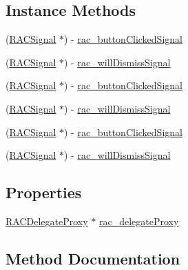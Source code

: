 \subsection*{Instance Methods}
\begin{DoxyCompactItemize}
\item 
(\mbox{\hyperlink{interface_r_a_c_signal}{R\+A\+C\+Signal}} $\ast$) -\/ \mbox{\hyperlink{category_u_i_alert_view_07_r_a_c_signal_support_08_afc61c8b02f0adc4622f827eef4a8c2af}{rac\+\_\+button\+Clicked\+Signal}}
\item 
(\mbox{\hyperlink{interface_r_a_c_signal}{R\+A\+C\+Signal}} $\ast$) -\/ \mbox{\hyperlink{category_u_i_alert_view_07_r_a_c_signal_support_08_aa0ae17a8658125f05c58f479cbaf2472}{rac\+\_\+will\+Dismiss\+Signal}}
\item 
(\mbox{\hyperlink{interface_r_a_c_signal}{R\+A\+C\+Signal}} $\ast$) -\/ \mbox{\hyperlink{category_u_i_alert_view_07_r_a_c_signal_support_08_afc61c8b02f0adc4622f827eef4a8c2af}{rac\+\_\+button\+Clicked\+Signal}}
\item 
(\mbox{\hyperlink{interface_r_a_c_signal}{R\+A\+C\+Signal}} $\ast$) -\/ \mbox{\hyperlink{category_u_i_alert_view_07_r_a_c_signal_support_08_aa0ae17a8658125f05c58f479cbaf2472}{rac\+\_\+will\+Dismiss\+Signal}}
\item 
(\mbox{\hyperlink{interface_r_a_c_signal}{R\+A\+C\+Signal}} $\ast$) -\/ \mbox{\hyperlink{category_u_i_alert_view_07_r_a_c_signal_support_08_afc61c8b02f0adc4622f827eef4a8c2af}{rac\+\_\+button\+Clicked\+Signal}}
\item 
(\mbox{\hyperlink{interface_r_a_c_signal}{R\+A\+C\+Signal}} $\ast$) -\/ \mbox{\hyperlink{category_u_i_alert_view_07_r_a_c_signal_support_08_aa0ae17a8658125f05c58f479cbaf2472}{rac\+\_\+will\+Dismiss\+Signal}}
\end{DoxyCompactItemize}
\subsection*{Properties}
\begin{DoxyCompactItemize}
\item 
\mbox{\hyperlink{interface_r_a_c_delegate_proxy}{R\+A\+C\+Delegate\+Proxy}} $\ast$ \mbox{\hyperlink{category_u_i_alert_view_07_r_a_c_signal_support_08_ae9b1bde4434c5912958337650d7aff85}{rac\+\_\+delegate\+Proxy}}
\end{DoxyCompactItemize}


\subsection{Method Documentation}
\mbox{\label{category_u_i_alert_view_07_r_a_c_signal_support_08_afc61c8b02f0adc4622f827eef4a8c2af}} 
